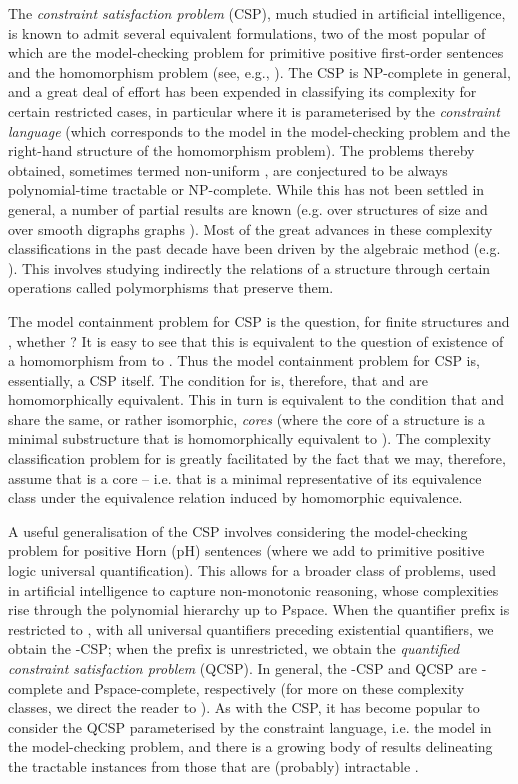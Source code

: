 \documentclass{LMCS}
\begin{document}
The \emph{constraint satisfaction problem} (CSP), much studied in artificial intelligence, is known to admit several equivalent formulations, two of the most popular of which are the model-checking problem for primitive positive first-order sentences and the homomorphism problem (see, e.g., \cite{KolaitisVardiBook05}). The CSP is NP-complete in general, and a great deal of effort has been expended in classifying its complexity for certain restricted cases, in particular where it is parameterised by the \emph{constraint language} (which corresponds to the model in the model-checking problem and the right-hand structure of the homomorphism problem). The problems  thereby obtained, sometimes termed non-uniform \cite{FederVardi}, are conjectured \cite{FederVardi,Bulatov00:algebras} to be always polynomial-time tractable or NP-complete. While this has not been settled in general, a number of partial results are known (e.g. over structures of size  \cite{Schaefer,BulatovJACM} and over smooth digraphs graphs \cite{HellNesetril,barto:1782}). Most of the great advances in these complexity classifications in the past decade have been driven by the algebraic method (\mbox{e.g.} \cite{BulatovJACM,barto:1782}). This involves studying indirectly the relations of a structure through certain operations called polymorphisms that preserve them.

The model containment problem for CSP is the question, for finite structures  and , whether ? It is easy to see that this is equivalent to the question of existence of a homomorphism from  to . Thus the model containment problem for CSP is, essentially, a CSP itself. The condition for  is, therefore, that  and  are homomorphically equivalent. This in turn is equivalent to the condition that  and  share the same, or rather isomorphic, \emph{cores} (where the core of a structure  is a minimal substructure that is homomorphically equivalent to ). The complexity classification problem for  is greatly facilitated by the fact that we may, therefore, assume that  is a core -- i.e. that  is a minimal representative of its equivalence class under the equivalence relation induced by homomorphic equivalence.

A useful generalisation of the CSP involves considering the model-checking problem for positive Horn (pH)  sentences (where we add to primitive positive logic universal quantification). This allows for a broader class of problems, used in artificial intelligence to capture non-monotonic reasoning, whose complexities rise through the polynomial hierarchy up to Pspace. 
When the quantifier prefix is restricted to , with all universal quantifiers preceding existential quantifiers, we obtain the -CSP; when the prefix is unrestricted, we obtain the \emph{quantified constraint satisfaction problem} (QCSP). In general, the -CSP and QCSP  are -complete and Pspace-complete, respectively (for more on these complexity classes, we direct the reader to \cite{ComputationalComplexity}).
As with the CSP, it has become popular to consider the QCSP parameterised by the constraint language, \mbox{i.e.} the model in the model-checking problem, and there is a growing body of results delineating the tractable instances from those that are (probably) intractable \cite{OxfordQuantifiedConstraints,chen-2006}. 
\end{document}
